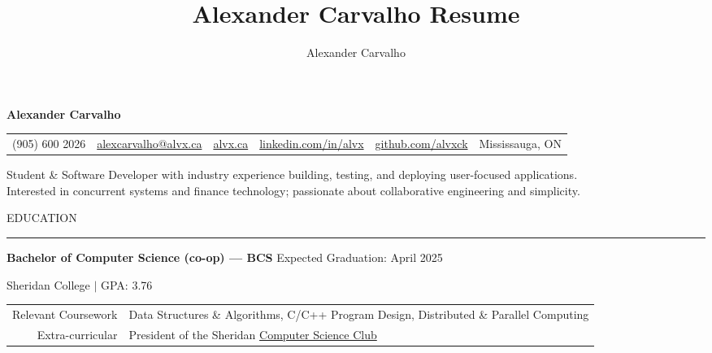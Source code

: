 \documentclass[9pt]{extarticle}
\title{Alexander Carvalho Resume}
\author{Alexander Carvalho}
\begin{document}
\color{regtextgray}


\begin{center}
	\textcolor{imptextblack}{\textbf{\fontsize{19}{0}\selectfont Alexander Carvalho}}

	\vspace{5pt}	

	\begin{tabular}{ c c c c c c }
		\textcolor{imptextblack}{(905) 600 2026} & 
		\href{mailto:alexcarvalho@alvx.ca}{alexcarvalho@alvx.ca} & 
		\href{alvx.ca}{alvx.ca} & 
		\href{https://www.linkedin.com/in/alvx}{linkedin.com/in/alvx} & 
		\href{https://www.github.com/alvxck}{github.com/alvxck} & 
		\textcolor{imptextblack}{Mississauga, ON}
	\end{tabular}

	\vspace{5pt}	

	Student \& Software Developer with industry experience building, testing, and deploying user-focused applications.  \\
	Interested in concurrent systems and finance technology; passionate about collaborative engineering and simplicity.
\end{center}


\begin{adjustwidth}{4pt}{4pt} \large \textrm{EDUCATION} \end{adjustwidth}
\rule[8pt]{\linewidth}{0.4pt}

\begin{adjustwidth}{10pt}{10pt}
	\vspace{-5pt}	

	\textcolor{imptextblack}{\textbf{\large Bachelor of Computer Science (co-op) — BCS}} \hfill Expected Graduation: April 2025
	
	Sheridan College $|$ {\small GPA: 3.76}
	
	\begin{adjustwidth}{18pt}{18pt}
		\begin{tabular}{ r l }
		 	\textcolor{imptextblack}{Relevant Coursework} & Data Structures \& Algorithms, C/C++ Program Design, Distributed \& Parallel Computing \\ 
			\textcolor{imptextblack}{Extra-curricular} & President of the Sheridan \href{https://sheridancollege.campuslabs.ca/engage/organization/mobilecomputingclub}{Computer Science Club} \\
		\end{tabular}
	\end{adjustwidth}
\end{adjustwidth}
\end{document}
